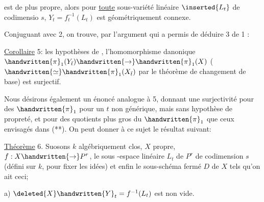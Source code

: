 est de plus propre, alors pour \uline{toute} sous-variété linéaire $\inserted{L_t}$ de codimensio $s$, $Y_t=f_t^{-1}(L_t)$ est géométriquement connexe.

Conjuguant avec 2, on trouve, par l'argument qui a permis de déduire 3 de 1 :

\uline{Corollaire} 5:  les hypothèses de  ,  l'homomorphisme danonique $\handwritten{\pi}_1(Y_{\bar t})\handwritten{\rightarrow}\handwritten{\pi}_1(X)$ ($\handwritten{\simeq}\handwritten{\pi}_1(X_{\bar t})$ par le théorème de changement de base) est surjectif.

Nous désirons également un énoncé analogue à 5, donnant une surjectivité pour des $\handwritten{\pi}_1$ pour un $t$ non générique, mais sans hypothèse de propreté, et pour des quotients plus gros du $\handwritten{\pi}_1$ que ceux envisagés dans (**). On peut donner à ce sujet le résultat suivant:

\uline{Théorème} 6. Suosons $k$ algébriquement clos,  $X$ propre, $f:X\handwritten{\rightarrow}P^r$,  le sous -espace linéaire $L_t$ de $P^r$ de codimension $s$ (défini sur $k$, pour fixer les idées)  et enfin le sous-schéma fermé $D$ de $X$ tels qu'on ait ceci; 

a)  $\deleted{X}\handwritten{Y}_t=f^{-1}(L_t)$ est non vide.

